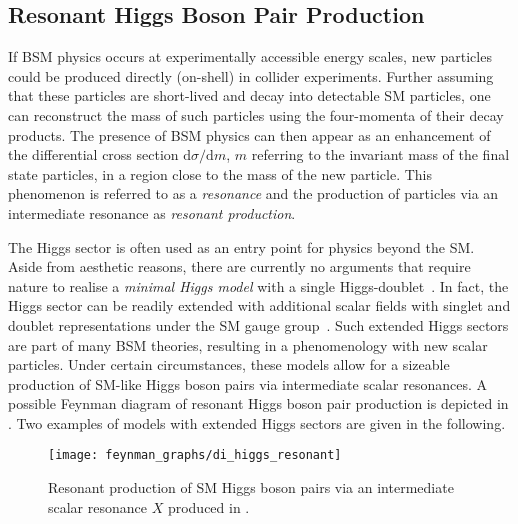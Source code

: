 

\subsection{Resonant Higgs Boson Pair Production}%
\label{sec:bsm_resonant_hh}

If BSM physics occurs at experimentally accessible energy scales, new particles
could be produced directly (on-shell) in collider experiments. Further assuming
that these particles are short-lived and decay into detectable SM particles, one
can reconstruct the mass of such particles using the four-momenta of their decay
products. The presence of BSM physics can then appear as an enhancement of the
differential cross section $\mathrm{d}\sigma / \mathrm{d}m$, $m$ referring to
the invariant mass of the final state particles, in a region close to the mass
of the new particle. This phenomenon is referred to as a \emph{resonance} and
the production of particles via an intermediate resonance as \emph{resonant
  production}.

The Higgs sector is often used as an entry point for physics beyond the
SM. Aside from aesthetic reasons, there are currently no arguments that require
nature to realise a \emph{minimal Higgs model} with a single
Higgs-doublet~\cite{Gunion:1989we}. In fact, the Higgs sector can be readily
extended with additional scalar fields with singlet and doublet representations
under the SM gauge group~\cite{Gunion:1989we}. Such extended Higgs sectors are
part of many BSM theories, resulting in a phenomenology with new scalar
particles. Under certain circumstances, these models allow for a sizeable
production of SM-like Higgs boson pairs via intermediate scalar resonances. A
possible Feynman diagram of resonant Higgs boson pair production is depicted in
. Two examples of models with extended Higgs
sectors are given in the following.

\begin{figure}[htbp]
  \centering

  \texttt{[image: feynman\_graphs/di\_higgs\_resonant]}

  \caption{Resonant production of SM Higgs boson pairs via an intermediate
    scalar resonance $X$ produced in \ggF.}%
  \label{fig:resonant_production_feyn}
\end{figure}

